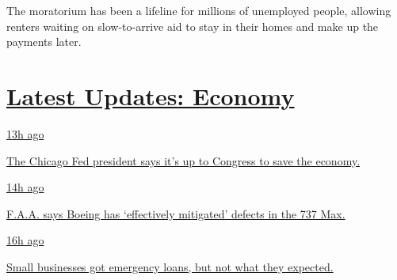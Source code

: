 The moratorium has been a lifeline for millions of unemployed people,
allowing renters waiting on slow-to-arrive aid to stay in their homes
and make up the payments later.

\hypertarget{latest-updates-economy}{%
\section{\texorpdfstring{\href{https://www.nytimes.com/live/2020/08/03/business/stock-market-today-coronavirus?action=click\&pgtype=Article\&state=default\&region=MAIN_CONTENT_1\&context=storylines_live_updates}{Latest
Updates:
Economy}}{Latest Updates: Economy}}\label{latest-updates-economy}}

\href{https://www.nytimes.com/live/2020/08/03/business/stock-market-today-coronavirus?action=click\&pgtype=Article\&state=default\&region=MAIN_CONTENT_1\&context=storylines_live_updates\#the-chicago-fed-president-says-its-up-to-congress-to-save-the-economy}{13h
ago}

\href{https://www.nytimes.com/live/2020/08/03/business/stock-market-today-coronavirus?action=click\&pgtype=Article\&state=default\&region=MAIN_CONTENT_1\&context=storylines_live_updates\#the-chicago-fed-president-says-its-up-to-congress-to-save-the-economy}{The
Chicago Fed president says it's up to Congress to save the economy.}

\href{https://www.nytimes.com/live/2020/08/03/business/stock-market-today-coronavirus?action=click\&pgtype=Article\&state=default\&region=MAIN_CONTENT_1\&context=storylines_live_updates\#faa-says-boeing-has-effectively-mitigated-defects-in-the-737-max}{14h
ago}

\href{https://www.nytimes.com/live/2020/08/03/business/stock-market-today-coronavirus?action=click\&pgtype=Article\&state=default\&region=MAIN_CONTENT_1\&context=storylines_live_updates\#faa-says-boeing-has-effectively-mitigated-defects-in-the-737-max}{F.A.A.
says Boeing has `effectively mitigated' defects in the 737 Max.}

\href{https://www.nytimes.com/live/2020/08/03/business/stock-market-today-coronavirus?action=click\&pgtype=Article\&state=default\&region=MAIN_CONTENT_1\&context=storylines_live_updates\#small-businesses-got-emergency-loans-but-not-what-they-expected}{16h
ago}

\href{https://www.nytimes.com/live/2020/08/03/business/stock-market-today-coronavirus?action=click\&pgtype=Article\&state=default\&region=MAIN_CONTENT_1\&context=storylines_live_updates\#small-businesses-got-emergency-loans-but-not-what-they-expected}{Small
businesses got emergency loans, but not what they expected.}

